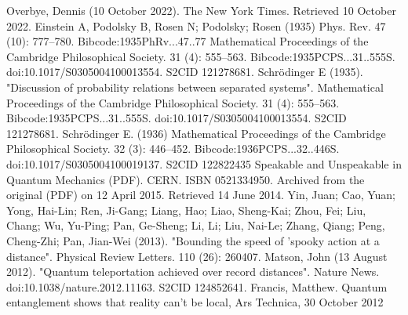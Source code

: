 \documentclass[12pt , a4paper]{article}
\begin{document}
\clearpage
\begin{thebibliography} {}

 Overbye, Dennis (10 October 2022). The New York Times. Retrieved 10 October 2022.	
 Einstein A, Podolsky B, Rosen N; Podolsky; Rosen (1935) Phys. Rev. 47 (10): 777–780. Bibcode:1935PhRv...47..77 Mathematical Proceedings of the Cambridge Philosophical Society. 31 (4): 555–563. Bibcode:1935PCPS...31..555S. doi:10.1017/S0305004100013554. S2CID 121278681.
 Schrödinger E (1935). "Discussion of probability relations between separated systems". Mathematical Proceedings of the Cambridge Philosophical Society. 31 (4): 555–563. Bibcode:1935PCPS...31..555S. doi:10.1017/S0305004100013554. S2CID 121278681.
 Schrödinger E. (1936) Mathematical Proceedings of the Cambridge Philosophical Society. 32 (3): 446–452. Bibcode:1936PCPS...32..446S. doi:10.1017/S0305004100019137. S2CID 122822435
Speakable and Unspeakable in Quantum Mechanics (PDF). CERN. ISBN 0521334950. Archived from the original (PDF) on 12 April 2015. Retrieved 14 June 2014.
Yin, Juan; Cao, Yuan; Yong, Hai-Lin; Ren, Ji-Gang; Liang, Hao; Liao, Sheng-Kai; Zhou, Fei; Liu, Chang; Wu, Yu-Ping; Pan, Ge-Sheng; Li, Li; Liu, Nai-Le; Zhang, Qiang; Peng, Cheng-Zhi; Pan, Jian-Wei (2013). "Bounding the speed of 'spooky action at a distance". Physical Review Letters. 110 (26): 260407.
 Matson, John (13 August 2012). "Quantum teleportation achieved over record distances". Nature News. doi:10.1038/nature.2012.11163. S2CID 124852641.
 Francis, Matthew. Quantum entanglement shows that reality can't be local, Ars Technica, 30 October 2012

\end{thebibliography}
\end{document}
